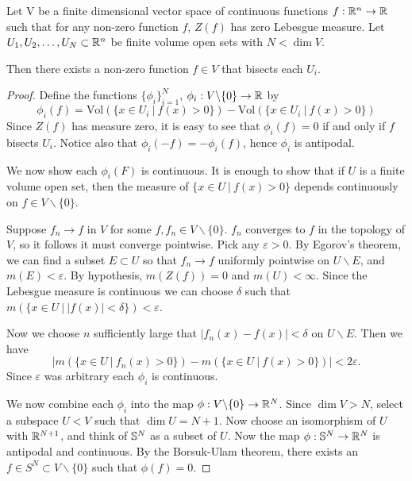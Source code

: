 \begin{theorem}
Let V be a finite dimensional vector space of continuous functions $f:\mathbb R^n \to \mathbb R$ such that for any non-zero function $f$,
 $Z(f)$ has zero Lebesgue measure. 
Let $U_1,U_2,\dots,U_N \subset \mathbb R^n$ be finite volume open sets with $N< \dim V$. 

Then there exists a non-zero function $f \in V$ that bisects each $U_i$. \label{thm:GenHamSand}
\end{theorem}
\begin{proof}
Define the functions $\{\phi_i\}_{i=1}^N$, $\phi_i: V\backslash \{0\} \to \mathbb R$ by
\[
\phi_i(f) = \text{Vol}(\{x\in U_i \ | \ f(x) > 0 \}) - \text{Vol}(\{x\in U_i \ |\ f(x) > 0 \})
\]
Since $Z(f)$ has measure zero, it is easy to see that $\phi_i(f) = 0$ if and only if $f$ bisects $U_i$. 
Notice also that $\phi_i(-f) = -\phi_i(f)$, hence $\phi_i$ is antipodal. 

We now show each $\phi_i(F)$ is continuous.
It is enough to show that if $U$ is a finite volume open set, then the measure of $\{x\in U\ |\ f(x)>0\}$ depends continuously on $f\in V \backslash \{0\}$.

Suppose $f_n \to f$ in $V$ for some $f,f_n \in V \backslash \{0\}$. $f_n$ converges to $f$ in the topology of $V$, 
so it follows it must converge pointwise. Pick any $\varepsilon >0$. 
By Egorov's theorem, we can find a subset $E\subset U$ so that $f_n \to f$ uniformly pointwise on $U \backslash E$, and $m(E)< \varepsilon$.
By hypothesis, $m(Z(f)) =0$ and $m(U) < \infty$. 
Since the Lebesgue measure is continuous we can choose $\delta$ such that $m\left(\{x\in U\ |\ |f(x)|<\delta\}\right) < \varepsilon$.

Now we choose $n$ sufficiently large that $|f_n (x) - f(x)| < \delta$ on $U\backslash E$. Then we have \[|m\left(\{x\in U\ |\ f_n(x)>0\}\right) - m\left(\{x\in U\ |\ f(x)>0\}\right)| < 2 \varepsilon.\] Since $\varepsilon$ was arbitrary each $\phi_i$ is continuous.


We now combine each $\phi_i$ into the map $\phi : V\backslash \{0\} \to \mathbb R^N$. Since $\dim V > N$, select a subspace $U < V$ such that $\dim U = N+1$. 
Now choose an isomorphism of $U$ with $\mathbb R^{N+1}$, and think of $\mathbb S^N$ as a subset of $U$.
Now the map $\phi: \mathbb S^N \to \mathbb R^N$ is antipodal and continuous. 
By the Borsuk-Ulam theorem, there exists an $f\in S^N \subset V\backslash \{0\}$ such that $\phi(f) = 0$.
\end{proof}

